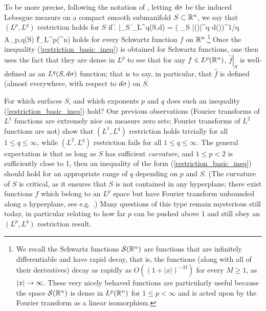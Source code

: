 \documentclass[brochure,english,12pt]{bourbaki}%
\begin{document}
To be more precise, following the notation of \cite[Ch. VIII \S4]{SteinHA}, letting $d\sigma$ be the induced Lebesgue measure on a compact smooth submanifold $S \subset \mathbb{R}^n$, we say that $(L^p,L^q)$ restriction holds for $S$ if
\beq\label{restriction_basic_ineq}
  \| \left.  \right|_S \|_{L^q(S,d\sig)} = ( \int_{S} |(\xi)|^q d\sig (\xi))^{1/q} \leq A_{p,q}(S) \|f\|_{L^p(\R^n)} 
 \eeq
holds for every Schwartz function $f$ on $\mathbb{R}^n$.\footnote{We recall the Schwartz functions $\mathcal{S}(\mathbb{R}^n)$ are functions that are infinitely differentiable and have rapid decay, that is, the functions (along with all of their derivatives) decay as rapidly as $O((1+|x|)^{-M})$ for every $M \geq 1$, as $|x| \rightarrow \infty$.  These very nicely behaved functions are particularly useful because the space $\mathcal{S} (\mathbb{R}^n)$ is dense in $L^p(\mathbb{R}^n)$ for $1 \leq p < \infty$ and is acted upon by the Fourier transform as a linear isomorphism.}
Once the inequality (\ref{restriction_basic_ineq}) is obtained for Schwartz functions,  one then uses the fact that they are dense in $L^p$ to see that for any $f \in L^p(\mathbb{R}^n)$, $\left. \hat{f} \right|_S$ is well-defined as an $L^q(S,d\sigma)$ function; that is to say, in particular, that $\hat{f}$ is defined (almost everywhere, with respect to $d\sigma$) on $S$. 

For which surfaces $S$, and which exponents $p$ and $q$ does such an inequality (\ref{restriction_basic_ineq}) hold? 
Our previous observations (Fourier transforms of $L^1$ functions are extremely nice on measure zero sets; Fourier transforms of $L^2$ functions are not) show that $(L^1,L^q)$ restriction holds trivially for all $1 \leq q \leq \infty$, while $(L^2,L^q)$ restriction fails for all $1 \leq q \leq \infty$.
The general expectation is that as long as $S$ has sufficient \emph{curvature}, and $1 \leq p<2$ is sufficiently close to 1, then an inequality of the form (\ref{restriction_basic_ineq}) should hold for an appropriate range of $q$ depending on $p$ and $S$.
 (The curvature of $S$ is critical, as it ensures that $S$ is not contained in any hyperplane; there exist functions $f$ which belong to an $L^p$ space but have Fourier transform unbounded along a hyperplane, see e.g. \cite{Tao04}.)
  Many questions of this type remain mysterious still today, in particular relating to how far $p$ can be pushed above 1 and still obey an $(L^p,L^q)$ restriction result.
\end{document}
